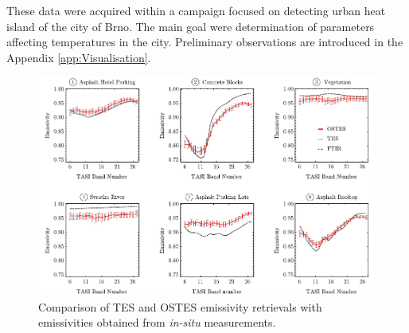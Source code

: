These data were acquired within a campaign focused on detecting urban heat island of the city of Brno. The main goal were determination of parameters affecting temperatures in the city. Preliminary observations are introduced in the Appendix \ref{app:Visualisation}.

\begin{figure}[!t]
\centering
\includegraphics[width=\linewidth]{pics/Chapter_04/Brno-Emissivity-Comparison.pdf}
\vspace{1.5 em}
\caption{Comparison of TES and OSTES emissivity retrievals with emissivities obtained from \textit{in-situ} measurements.}
\label{fig:BrnoEmissivityComparison}
\end{figure}


